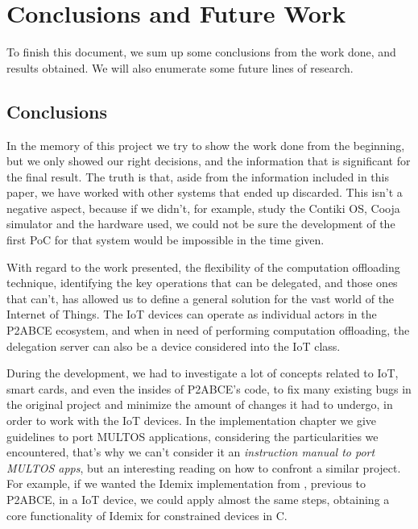 \chapter{Conclusions and Future Work}\label{ch:conclusions}

To finish this document, we sum up some conclusions from the work done, and results 
obtained. We will also enumerate some future lines of research.

\section{Conclusions}


In the memory of this project we try to show the work done from the beginning, but we only showed our right decisions, and the information that is significant for the final result. The truth is that, aside from the information included in this paper, we have worked with other systems that ended up discarded. This isn't a negative aspect, because if we didn't, for example, study the Contiki OS, Cooja simulator and the hardware used, we could not be sure the development of the first PoC for that system would be impossible in the time given.


With regard to the work presented, the flexibility of the computation offloading technique, identifying the key operations that can be delegated, and those ones that can't, has allowed us to define a general solution for the vast world of the Internet of Things. The IoT devices can operate as individual actors in the P2ABCE ecosystem, and when in need of performing computation offloading, the delegation server can also be a device considered into the IoT class.




During the development, we had to investigate a lot of concepts related to IoT, smart cards, and even the insides of P2ABCE's code, to fix many existing bugs in the original project and minimize the amount of changes it had to undergo, in order to work with the IoT devices. In the implementation chapter we give guidelines to port MULTOS applications, considering the particularities we encountered, that's why we can't consider it an \textit{instruction manual to port MULTOS apps}, but an interesting reading on how to confront a similar project. For example, if we wanted the Idemix implementation from \citep{vullers2013efficient}, previous to P2ABCE, in a IoT device, we could apply almost the same steps, obtaining a core functionality of Idemix for constrained devices in C.

